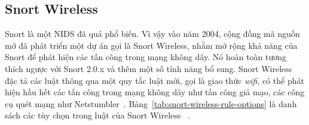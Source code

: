 \subsection{Snort Wireless}
Snort là một NIDS đã quá phổ biến. Vì vậy vào năm 2004, cộng đồng mã nguồn mở đã phát triển một dự án gọi là Snort Wireless, nhằm mở rộng khả năng của Snort để phát hiện các tấn công trong mạng không dây. Nó hoàn toàn tương thích ngược với Snort 2.0.x và thêm một số tính năng bổ sung. Snort Wireless đặc tả các luật thông qua một quy tắc luật mới, gọi là giao thức \emph{wifi}, có thể phát hiện hầu hết các tấn công trong mạng không dây như tấn công giả mạo, các công cụ quét mạng như Netstumbler~\cite{caswell2005nessus}. Bảng~\ref{tab:snort-wireless-rule-options} là danh sách các tùy chọn trong luật của Snort Wireless~\cite{valli2004wireless} .

\headsep=0pt

